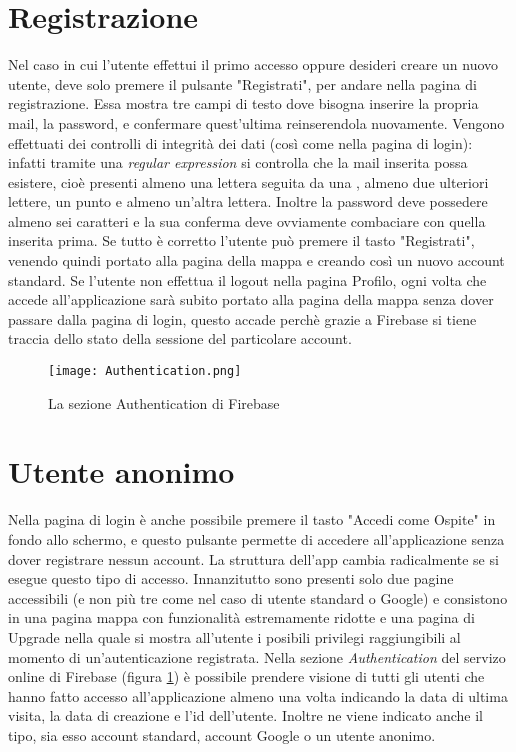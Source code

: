 \section{Registrazione}
Nel caso in cui l'utente effettui il primo accesso oppure desideri creare un
nuovo utente, deve solo premere il pulsante "Registrati", per andare nella
pagina di registrazione. Essa mostra tre campi di testo dove bisogna inserire la
propria mail, la password, e confermare quest'ultima reinserendola nuovamente.
Vengono effettuati dei controlli di integrità dei dati (così come
nella pagina di login): infatti tramite una \textit{regular expression} si
controlla che la mail inserita possa esistere, cioè presenti almeno una
lettera seguita da una \MVAt, almeno due ulteriori lettere, un punto e almeno un'altra
lettera. Inoltre la password deve possedere almeno sei caratteri e la sua
conferma deve ovviamente combaciare con quella inserita prima. Se tutto è
corretto l'utente può premere il tasto "Registrati", venendo quindi portato alla
pagina della mappa e creando così un nuovo account standard. \newline
Se l'utente non effettua il logout nella pagina Profilo, ogni volta che accede
all'applicazione sarà subito portato alla pagina della mappa senza dover passare
dalla pagina di login, questo accade perchè grazie a Firebase si tiene traccia
dello stato della sessione del particolare account.

\begin{figure}[h!]
    \centering
    \texttt{[image: Authentication.png]}
    \caption{La sezione Authentication di Firebase}
    \label{authentication}
\end{figure}

\section{Utente anonimo}
Nella pagina di login è anche possibile premere il tasto "Accedi come Ospite" in
fondo allo schermo, e questo pulsante permette di accedere all'applicazione
senza dover registrare nessun account. La struttura dell'app cambia radicalmente
se si esegue questo tipo di accesso. Innanzitutto sono presenti solo due pagine
accessibili (e non più tre come nel caso di utente standard o Google) e consistono in una
pagina mappa con funzionalità estremamente ridotte e una pagina di Upgrade nella
quale si mostra all'utente i posibili privilegi raggiungibili al momento di
un'autenticazione registrata. Nella sezione \textit{Authentication} del servizo
online di Firebase (figura \ref{authentication}) è possibile prendere visione di tutti gli utenti che hanno
fatto accesso all'applicazione almeno una volta indicando la data di ultima
visita, la data di creazione e l'id dell'utente. Inoltre ne viene indicato anche
il tipo, sia esso account standard, account Google o un utente anonimo.

